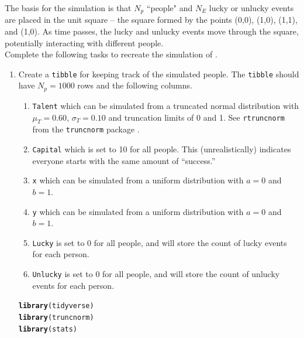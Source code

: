 \documentclass{article}\usepackage[]{graphicx}\usepackage[]{xcolor}
\makeatletter
\newcommand{\hldef}[1]{\textcolor[rgb]{0.345,0.345,0.345}{#1}}%
\newcommand{\hlkwd}[1]{\textcolor[rgb]{0.737,0.353,0.396}{\textbf{#1}}}%
\newenvironment{kframe}{%
 \def\at@end@of@kframe{}%
 \ifinner\ifhmode%
  \def\at@end@of@kframe{\end{minipage}}%
  \begin{minipage}{\columnwidth}%
 \fi\fi%
 \def\FrameCommand##1{\hskip\@totalleftmargin \hskip-\fboxsep
 \colorbox{shadecolor}{##1}\hskip-\fboxsep
     \hskip-\linewidth \hskip-\@totalleftmargin \hskip\columnwidth}%
 \MakeFramed {\advance\hsize-\width
   \@totalleftmargin\z@ \linewidth\hsize
   \@setminipage}}%
 {\par\unskip\endMakeFramed%
 \at@end@of@kframe}
\newenvironment{knitrout}{}{} %
\makeatother
\begin{document}
The basis for the simulation is that $N_p$ ``people" and $N_E$ lucky or unlucky events are placed in the unit square -- the square formed by the points (0,0), (1,0), (1,1), and (1,0). As time passes, the lucky and unlucky events move through the square, potentially interacting with different people.\\

Complete the following tasks to recreate the simulation of \cite{Pluchino18}.

\begin{enumerate}
\item Create a \texttt{tibble} for keeping track of the simulated people. The \texttt{tibble} should have $N_p=1000$ rows and the following columns.
\begin{enumerate}
\item \texttt{Talent} which can be simulated from a truncated normal distribution with $\mu_T = 0.60$, $\sigma_T=0.10$ and truncation limits of 0 and 1. See \texttt{rtruncnorm} from the \texttt{truncnorm} package \citep{truncnorm}.
\item \texttt{Capital} which is set to 10 for all people. This (unrealistically) indicates everyone starts with the same amount of ``success.''
\item \texttt{x} which can be simulated from a uniform distribution with $a=0$ and $b=1$.
\item \texttt{y} which can be simulated from a uniform distribution with $a=0$ and $b=1$.
\item \texttt{Lucky} is set to 0 for all people, and will store the count of lucky events for each person.
\item \texttt{Unlucky} is set to 0 for all people, and will store the count of unlucky events for each person.
\end{enumerate}

\begin{knitrout}\scriptsize
{}\color{fgcolor}\begin{kframe}
\begin{alltt}
\hlkwd{library}\hldef{(tidyverse)}
\hlkwd{library}\hldef{(truncnorm)}
\hlkwd{library}\hldef{(stats)}


\end{alltt}
\end{kframe}
\end{knitrout}
\end{enumerate}
\end{document}

